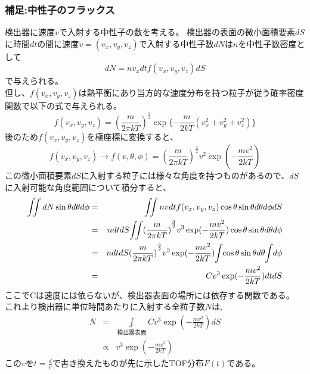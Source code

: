 \subsubsection{補足:中性子のフラックス}
検出器に速度$v$で入射する中性子の数を考える。
検出器の表面の微小面積要素$dS$に時間$dt$の間に速度$v=(v_x,v_y,v_z)$で入射する中性子数$dN$は$n$を中性子数密度として
\begin{equation}
dN=nv_xdtf(v_x,v_y,v_z)dS
\end{equation}
で与えられる。\\
但し、$f(v_x,v_y,v_z)$は熱平衡にあり当方的な速度分布を持つ粒子が従う確率密度関数で以下の式で与えられる。
\begin{equation}
f(v_x,v_y,v_z)={(\frac{m}{2\pi kT})}^{\frac{3}{2}}\exp\{-\frac{m}{2kT}(v^2_x+v^2_y+v^2_z)\} 
\end{equation}
後のため$f(v_x,v_y,v_z)$を極座標に変換すると、
\begin{equation}
f(v_x,v_y,v_z) \rightarrow f(v,\theta,\phi)={(\frac{m}{2\pi kT})}^{\frac{3}{2}}v^2\exp(-\frac{mv^2}{2kT})
\end{equation}
この微小面積要素$dS$に入射する粒子には様々な角度を持つものがあるので、$dS$に入射可能な角度範囲について積分すると、
\begin{eqnarray*}
 \iint dN\sin\theta d\theta d\phi &=&\iint nvdtf(v_x,v_y,v_z)\cos\theta \sin\theta d\theta d\phi dS \\ 
&=&ndtdS \hspace{-2pt}\iint \hspace{-2pt}{(\frac{m}{2\pi kT})}^{\frac{3}{2}}v^3\exp(-\frac{mv^2}{2kT})\cos\theta \sin\theta d\theta d\phi  \\
&=&ndtdS{(\frac{m}{2\pi kT})}^{\frac{3}{2}} v^3\exp(-\frac{mv^2}{2kT}) \hspace{-2pt}\int \hspace{-2pt}\cos\theta\sin\theta d\theta \hspace{-2pt}\int \hspace{-2pt} d\phi \\
&=&Cv^3\exp(-\frac{mv^2}{2kT})dtdS
\end{eqnarray*}
ここでCは速度には依らないが、検出器表面の場所には依存する関数である。
これより検出器に単位時間あたりに入射する全粒子数$N$は,
\begin{eqnarray*}
N &=&
\int\limits_{\text{} 検出器表面}Cv^3\exp(-\frac{mv^2}{2kT})dS \\
&\propto& v^3\exp(-\frac{mv^2}{2kT})
\end{eqnarray*}
この$v$を$t=\frac{d}{v}$で書き換えたものが先に示したTOF分布$F(t)$である。
